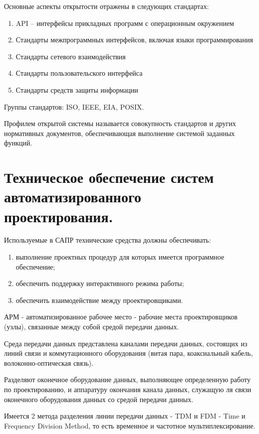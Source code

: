 \documentclass[unicode, 12pt, a4paper, oneside]{article}
\begin{document}
Основные аспекты открытости отражены в следующих стандартах:

\begin{enumerate}
\item API – интерфейсы прикладных программ с операционным окружением
\item Стандарты межпрограммных интерфейсов, включая языки программирования
\item Стандарты сетевого взаимодействия
\item Стандарты пользовательского интерфейса
\item Стандарты средств защиты информации
\end{enumerate}

Группы стандартов: ISO, IEEE, EIA, POSIX.

Профилем открытой системы называется совокупность стандартов и других нормативных документов, обеспечивающая выполнение системой заданных функций.

\section{Техническое обеспечение систем автоматизированного проектирования.}

Используемые в САПР технические средства должны обеспечивать:

\begin{enumerate}
\item выполнение проектных процедур для которых имеется программное обеспечение;
\item обеспечить поддержку интерактивного режима работы;
\item обеспечить взаимодействие между проектировщиками.
\end{enumerate}

АРМ - автоматизированное рабочее место - рабочие места проектировщиков (узлы), связанные между собой средой передачи данных.

Среда передачи данных представлена каналами передачи данных, состоящих из линий связи и коммутационного оборудования (витая пара, коаксиальный кабель, волоконно-оптическая связь).

Разделяют оконечное оборудование данных, выполняющее определенную работу по проектированию, и аппаратуру окончания канала данных, служащую ля связи оконечного оборудования данных со средой передачи данных.

Имеется 2 метода разделения линии передачи данных - TDM и FDM - Time и Frequency Division Method, то есть временное и частотное мультиплексирование.
\end{document}
